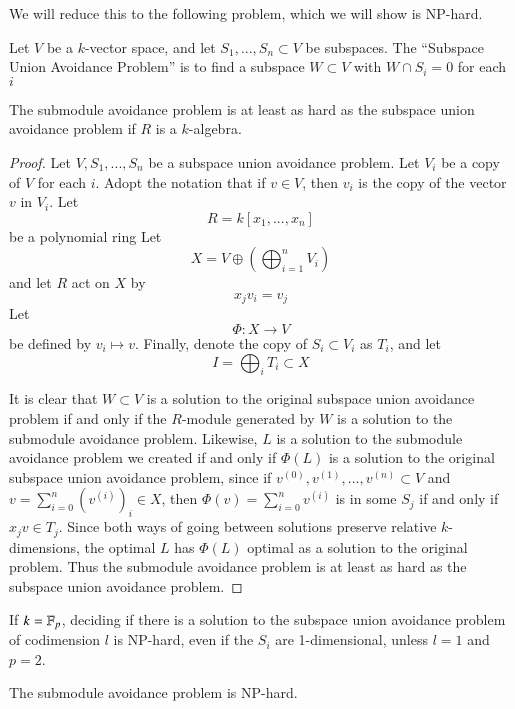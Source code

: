 We will reduce this to the following problem, which we will show is NP-hard.

\begin{Def}
  Let $V$ be a $k$-vector space, and let $S_1,...,S_n\subset V$ be subspaces.
  The ``Subspace Union Avoidance Problem'' is to find a subspace $W\subset V$ with $W\cap S_i=0$ for each $i$
\end{Def}

\begin{Lemma}
  The submodule avoidance problem is at least as hard as the subspace union avoidance problem if $R$ is a $k$-algebra.
\end{Lemma}

\begin{proof}
  Let $V, S_1,...,S_n$ be a subspace union avoidance problem.
  Let $V_i$ be a copy of $V$ for each $i$.  Adopt the notation that if $v\in V$, then $v_i$ is the copy of the vector $v$ in $V_i$.  
  Let
  \[R=k[x_1,...,x_n]\]
  be a polynomial ring 
  Let   
  \[X=V\oplus \left(\bigoplus_{i=1}^n V_i\right)\]
  and let $R$ act on $X$ by
  \[x_jv_i = v_j\]
  Let
  \[\Phi : X \to V\]
  be defined by $v_i\mapsto v$.
  Finally, denote the copy of $S_i\subset V_i$ as $T_i$, and let 
  \[I=\bigoplus_i T_i\subset X\]
  
  It is clear that $W\subset V$ is a solution to the original subspace union avoidance problem if and only if the $R$-module generated by $W$ is a solution to the submodule avoidance problem.
  Likewise, $L$ is a solution to the submodule avoidance problem we created if and only if $\Phi(L)$ is a solution to the original subspace union avoidance problem, since if $v^{(0)},v^{(1)},...,v^{(n)}\subset V$ and $v=\sum_{i=0}^n(v^{(i)})_i\in X$, then $\Phi(v) =\sum_{i=0}^n v^{(i)}$ is in some $S_j$ if and only if $x_jv\in T_j$.  
  Since both ways of going between solutions preserve relative $k$-dimensions, the optimal $L$ has $\Phi(L)$ optimal as a solution to the original problem.  
Thus the submodule avoidance problem is at least as hard as the subspace union avoidance problem.
 
\end{proof}

\begin{Lemma}
  \label{sec:npcomplem}
  If $k=\mathbb{F}_p$, deciding if there is a solution to the subspace union avoidance problem of codimension $l$ is NP-hard, even if the $S_i$ are 1-dimensional, unless $l=1$ and $p=2$.  
\end{Lemma}

\begin{Cor}
  The submodule avoidance problem is NP-hard.
\end{Cor}

